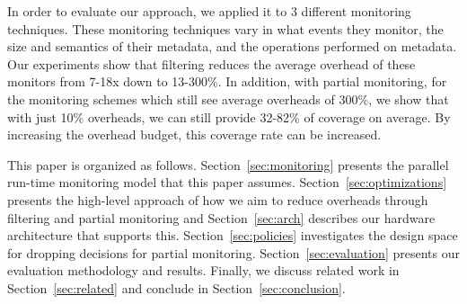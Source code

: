 
In order to evaluate our approach, we applied it to 3 different monitoring
techniques. These monitoring techniques vary in what events they monitor, the
size and semantics of their metadata, and the operations performed on metadata.
Our experiments show that filtering reduces the average overhead of these
monitors from 7-18x down to 13-300\%.
In addition, with partial monitoring, for the monitoring schemes which still
see average overheads of 300\%, we show that with just 10\% overheads, we can still
provide 32-82\% of coverage on average. By increasing the
overhead budget, this coverage rate can be increased. 

This paper is organized as follows. Section~\ref{sec:monitoring} presents the
parallel run-time monitoring model that this paper assumes.
Section~\ref{sec:optimizations} presents the high-level approach of how we aim
to reduce overheads through filtering and partial monitoring and Section~\ref{sec:arch} describes our
hardware architecture that supports this. Section~\ref{sec:policies}
investigates the design space for dropping decisions for partial monitoring.
Section~\ref{sec:evaluation} presents our evaluation methodology and
results. Finally, we discuss related work in Section~\ref{sec:related} and
conclude in Section~\ref{sec:conclusion}.

